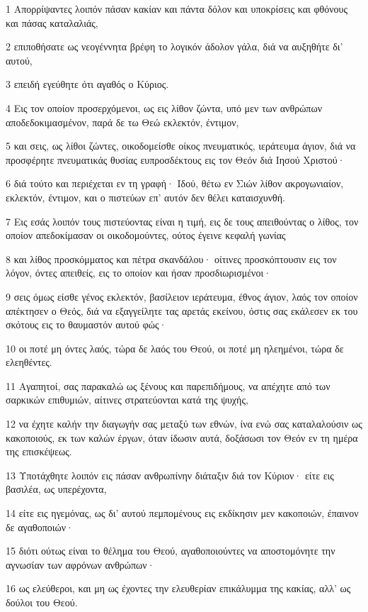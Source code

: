 \par 1 Απορρίψαντες λοιπόν πάσαν κακίαν και πάντα δόλον και υποκρίσεις και φθόνους και πάσας καταλαλιάς,
\par 2 επιποθήσατε ως νεογέννητα βρέφη το λογικόν άδολον γάλα, διά να αυξηθήτε δι' αυτού,
\par 3 επειδή εγεύθητε ότι αγαθός ο Κύριος.
\par 4 Εις τον οποίον προσερχόμενοι, ως εις λίθον ζώντα, υπό μεν των ανθρώπων αποδεδοκιμασμένον, παρά δε τω Θεώ εκλεκτόν, έντιμον,
\par 5 και σεις, ως λίθοι ζώντες, οικοδομείσθε οίκος πνευματικός, ιεράτευμα άγιον, διά να προσφέρητε πνευματικάς θυσίας ευπροσδέκτους εις τον Θεόν διά Ιησού Χριστού·
\par 6 διά τούτο και περιέχεται εν τη γραφή· Ιδού, θέτω εν Σιών λίθον ακρογωνιαίον, εκλεκτόν, έντιμον, και ο πιστεύων επ' αυτόν δεν θέλει καταισχυνθή.
\par 7 Εις εσάς λοιπόν τους πιστεύοντας είναι η τιμή, εις δε τους απειθούντας ο λίθος, τον οποίον απεδοκίμασαν οι οικοδομούντες, ούτος έγεινε κεφαλή γωνίας
\par 8 και λίθος προσκόμματος και πέτρα σκανδάλου· οίτινες προσκόπτουσιν εις τον λόγον, όντες απειθείς, εις το οποίον και ήσαν προσδιωρισμένοι·
\par 9 σεις όμως είσθε γένος εκλεκτόν, βασίλειον ιεράτευμα, έθνος άγιον, λαός τον οποίον απέκτησεν ο Θεός, διά να εξαγγείλητε τας αρετάς εκείνου, όστις σας εκάλεσεν εκ του σκότους εις το θαυμαστόν αυτού φώς·
\par 10 οι ποτέ μη όντες λαός, τώρα δε λαός του Θεού, οι ποτέ μη ηλεημένοι, τώρα δε ελεηθέντες.
\par 11 Αγαπητοί, σας παρακαλώ ως ξένους και παρεπιδήμους, να απέχητε από των σαρκικών επιθυμιών, αίτινες στρατεύονται κατά της ψυχής,
\par 12 να έχητε καλήν την διαγωγήν σας μεταξύ των εθνών, ίνα ενώ σας καταλαλούσιν ως κακοποιούς, εκ των καλών έργων, όταν ίδωσιν αυτά, δοξάσωσι τον Θεόν εν τη ημέρα της επισκέψεως.
\par 13 Υποτάχθητε λοιπόν εις πάσαν ανθρωπίνην διάταξιν διά τον Κύριον· είτε εις βασιλέα, ως υπερέχοντα,
\par 14 είτε εις ηγεμόνας, ως δι' αυτού πεμπομένους εις εκδίκησιν μεν κακοποιών, έπαινον δε αγαθοποιών·
\par 15 διότι ούτως είναι το θέλημα του Θεού, αγαθοποιούντες να αποστομόνητε την αγνωσίαν των αφρόνων ανθρώπων·
\par 16 ως ελεύθεροι, και μη ως έχοντες την ελευθερίαν επικάλυμμα της κακίας, αλλ' ως δούλοι του Θεού.
